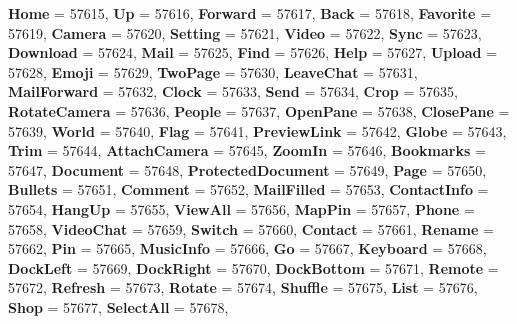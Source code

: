 \begin{DoxyCompactItemize}
{\bfseries Home} = 57615, 
{\bfseries Up} = 57616, 
{\bfseries Forward} = 57617, 
{\bfseries Back} = 57618, 
\newline
{\bfseries Favorite} = 57619, 
{\bfseries Camera} = 57620, 
{\bfseries Setting} = 57621, 
{\bfseries Video} = 57622, 
\newline
{\bfseries Sync} = 57623, 
{\bfseries Download} = 57624, 
{\bfseries Mail} = 57625, 
{\bfseries Find} = 57626, 
\newline
{\bfseries Help} = 57627, 
{\bfseries Upload} = 57628, 
{\bfseries Emoji} = 57629, 
{\bfseries Two\+Page} = 57630, 
\newline
{\bfseries Leave\+Chat} = 57631, 
{\bfseries Mail\+Forward} = 57632, 
{\bfseries Clock} = 57633, 
{\bfseries Send} = 57634, 
\newline
{\bfseries Crop} = 57635, 
{\bfseries Rotate\+Camera} = 57636, 
{\bfseries People} = 57637, 
{\bfseries Open\+Pane} = 57638, 
\newline
{\bfseries Close\+Pane} = 57639, 
{\bfseries World} = 57640, 
{\bfseries Flag} = 57641, 
{\bfseries Preview\+Link} = 57642, 
\newline
{\bfseries Globe} = 57643, 
{\bfseries Trim} = 57644, 
{\bfseries Attach\+Camera} = 57645, 
{\bfseries Zoom\+In} = 57646, 
\newline
{\bfseries Bookmarks} = 57647, 
{\bfseries Document} = 57648, 
{\bfseries Protected\+Document} = 57649, 
{\bfseries Page} = 57650, 
\newline
{\bfseries Bullets} = 57651, 
{\bfseries Comment} = 57652, 
{\bfseries Mail\+Filled} = 57653, 
{\bfseries Contact\+Info} = 57654, 
\newline
{\bfseries Hang\+Up} = 57655, 
{\bfseries View\+All} = 57656, 
{\bfseries Map\+Pin} = 57657, 
{\bfseries Phone} = 57658, 
\newline
{\bfseries Video\+Chat} = 57659, 
{\bfseries Switch} = 57660, 
{\bfseries Contact} = 57661, 
{\bfseries Rename} = 57662, 
\newline
{\bfseries Pin} = 57665, 
{\bfseries Music\+Info} = 57666, 
{\bfseries Go} = 57667, 
{\bfseries Keyboard} = 57668, 
\newline
{\bfseries Dock\+Left} = 57669, 
{\bfseries Dock\+Right} = 57670, 
{\bfseries Dock\+Bottom} = 57671, 
{\bfseries Remote} = 57672, 
\newline
{\bfseries Refresh} = 57673, 
{\bfseries Rotate} = 57674, 
{\bfseries Shuffle} = 57675, 
{\bfseries List} = 57676, 
\newline
{\bfseries Shop} = 57677, 
{\bfseries Select\+All} = 57678, 

\end{DoxyCompactItemize}
